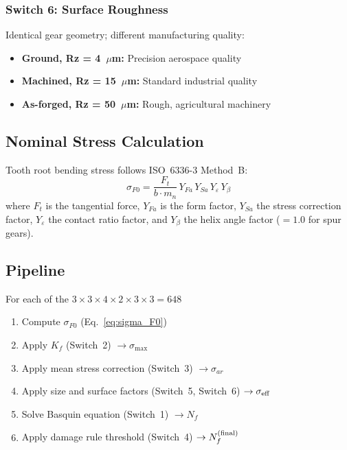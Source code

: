 \documentclass[12pt,a4paper]{article}
\begin{document}
\subsubsection{Switch 6: Surface Roughness}

Identical gear geometry; different manufacturing quality:

\begin{itemize}
  \item \textbf{Ground, Rz = 4~$\mu$m:} Precision aerospace quality
  \item \textbf{Machined, Rz = 15~$\mu$m:} Standard industrial quality
  \item \textbf{As-forged, Rz = 50~$\mu$m:} Rough, agricultural machinery
\end{itemize}

\subsection{Nominal Stress Calculation}

Tooth root bending stress follows ISO~6336-3 Method~B:
\begin{equation}
\label{eq:sigma_F0}
\sigma_{F0} = \frac{F_t}{b \cdot m_n} \,
Y_{Fa} \, Y_{Sa} \, Y_\varepsilon \, Y_\beta
\end{equation}
where $F_t$ is the tangential force, $Y_{Fa}$ is the form factor,
$Y_{Sa}$ the stress correction factor, $Y_\varepsilon$ the contact ratio
factor, and $Y_\beta$ the helix angle factor ($=1.0$ for spur gears).

\subsection{Pipeline}

For each of the $3\times3\times4\times2\times3\times3 = 648$ %
\begin{enumerate}
  \item Compute $\sigma_{F0}$ (Eq.~\ref{eq:sigma_F0})
  \item Apply $K_f$ (Switch~2) $\rightarrow \sigma_{\max}$
  \item Apply mean stress correction (Switch~3) $\rightarrow \sigma_{ar}$
  \item Apply size and surface factors (Switch~5, Switch~6)
        $\rightarrow \sigma_{\rm eff}$
  \item Solve Basquin equation (Switch~1) $\rightarrow N_f$
  \item Apply damage rule threshold (Switch~4) $\rightarrow N_f^{\rm (final)}$
\end{enumerate}
\end{document}
